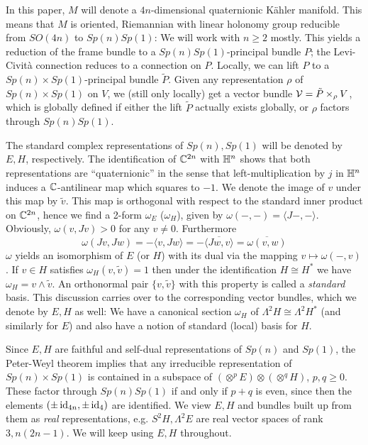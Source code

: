 \documentclass{scrartcl}
\begin{document}
\medskip

In this paper, $M$ will denote a $4n$-dimensional quaternionic K\"ahler manifold. This means that $M$ is oriented, Riemannian with linear holonomy group reducible from $SO(4n)$ to $Sp(n)Sp(1)$: We will work with $n\geq 2$ mostly. This yields a reduction of the frame bundle to a $Sp(n)Sp(1)$-principal bundle $P$; the Levi-Civit\`a connection reduces to a connection on $P$. Locally, we can lift $P$ to a $Sp(n)\times Sp(1)$-principal bundle $\tilde P$. Given any representation $\rho$ of $Sp(n)\times Sp(1)$ on $V$, we (still only locally) get a vector bundle $\mathcal{V}=\tilde P\times_\rho V$, which is globally defined if either the lift $\tilde P$ actually exists globally, or $\rho$ factors through $Sp(n)Sp(1)$.

\medskip

The standard complex representations of $Sp(n),Sp(1)$ will be denoted by $E,H$, respectively. The identification of $\mathbb{C}^{2n}$ with $\mathbb{H}^n$ shows that both representations are ``quaternionic'' in the sense that left-multiplication by $j$ in $\mathbb{H}^n$ induces a $\mathbb{C}$-antilinear map which squares to $-1$. We denote the image of $v$ under this map by $\tilde v$. This map is orthogonal with respect to the standard inner product on $\mathbb{C}^{2n}$, hence we find a 2-form $\omega_E$ ($\omega_H$), given by $\omega(-,-)=\langle J-,-\rangle$. Obviously, $\omega(v,Jv)>0$ for any $v\neq 0$. Furthermore
\begin{equation*}
	\omega(Jv,Jw)=-\langle v,Jw\rangle=-\overline{\langle Jw,v\rangle}
	=\overline{\omega(v,w)}
\end{equation*}
$\omega$ yields an isomorphism of $E$ (or $H$) with its dual via the mapping $v\mapsto \omega(-,v)$. If $v\in H$ satisfies $\omega_H(v,\tilde v)=1$ then under the identification $H\cong H^*$ we have $\omega_H=v\wedge \tilde v$. An orthonormal pair $\{v,\tilde v\}$ with this property is called a \emph{standard} basis. This discussion carries over to the corresponding vector bundles, which we denote by $E,H$ as well: We have a canonical section $\omega_H$ of $\Lambda^2 H\cong \Lambda^2 H^*$ (and similarly for $E$) and also have a notion of standard (local) basis for $H$.

\medskip

Since $E,H$ are faithful and self-dual representations of $Sp(n)$ and $Sp(1)$, the Peter-Weyl theorem implies
that any irreducible representation of $Sp(n)\times Sp(1)$ is contained in a subspace of $(\otimes^p E)\otimes (\otimes^q H)$, $p,q\geq 0$. These factor through $Sp(n)Sp(1)$ if and only if $p+q$ is even, since then the elements $(\pm \operatorname{id}_{4n},\pm\operatorname{id}_{4})$ are identified. We view $E,H$ and bundles built up from them as \emph{real} representations, e.g. $S^2H,\Lambda^2E$ are real vector spaces of rank $3,n(2n-1)$. We will keep using $E,H$ throughout.
\end{document}
